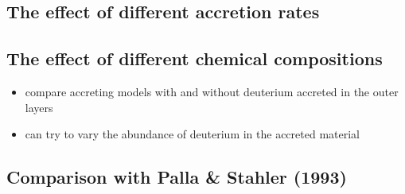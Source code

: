 \documentclass[12pt,a4paper]{article}
\newcommand{\mr}{\mathrm}
\newenvironment{outline}[1]{%
  \begin{itemize}[label=\textbullet]%
  \color{#1}%
}{%
  \end{itemize}%
}
\begin{document}
\subsection{The effect of different accretion rates}
\label{sec:accretion_rate}


\subsection{The effect of different chemical compositions}
\label{sec:chemical_composition}

\begin{outline}{gray}
  \item compare accreting models with and without deuterium accreted in the outer layers
  \item can try to vary the abundance of deuterium in the accreted material
\end{outline}

\subsection{Comparison with Palla \& Stahler (1993)}
\label{sec:comp_palla_stahler}



\end{document}
